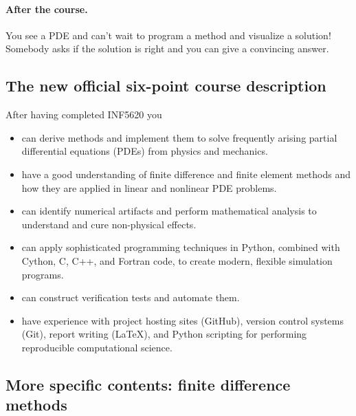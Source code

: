 \documentclass[%
oneside,                 %
final,                   %
10pt]{article}
\begin{document}
\noindent

\paragraph{After the course.}
You see a PDE and can't wait to program a method
and visualize a solution! Somebody asks if the solution is right
and you can give a convincing answer.



\subsection*{The new official six-point course description}

After having completed INF5620 you

\begin{itemize}
 \item can derive methods and implement them to solve frequently
   arising partial differential equations (PDEs) from physics and mechanics.

 \item have a good understanding of finite difference and finite element
   methods and how they are applied in linear and nonlinear PDE problems.

 \item can identify numerical artifacts and perform mathematical analysis
   to understand and cure non-physical effects.

 \item can apply sophisticated programming techniques in Python, combined
   with Cython, C, C++, and Fortran code, to create modern,
   flexible simulation programs.

 \item can construct verification tests and automate them.

 \item have experience with project hosting sites (GitHub),
   version control systems (Git), report writing ({\LaTeX}),
   and Python scripting for performing reproducible computational science.
\end{itemize}

\noindent

\subsection*{More specific contents: finite difference methods}
\end{document}
